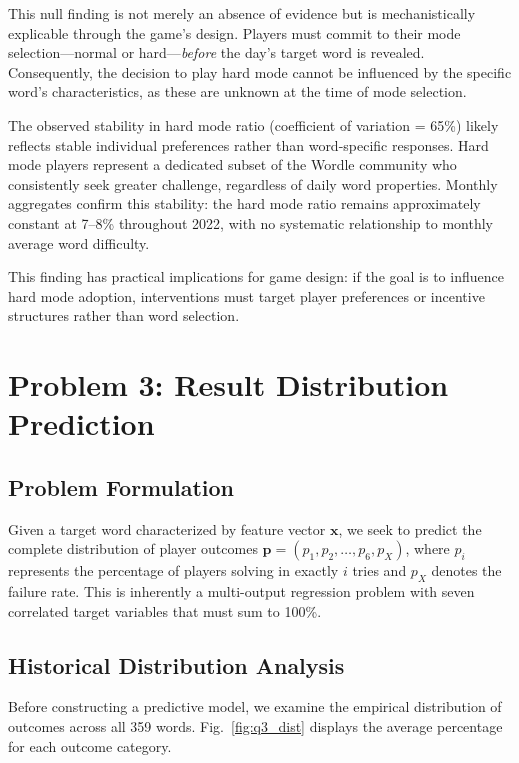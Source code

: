 \documentclass{mcmthesis}
\begin{document}
This null finding is not merely an absence of evidence but is mechanistically explicable through the game's design. Players must commit to their mode selection---normal or hard---\textit{before} the day's target word is revealed. Consequently, the decision to play hard mode cannot be influenced by the specific word's characteristics, as these are unknown at the time of mode selection.

The observed stability in hard mode ratio (coefficient of variation = 65\%) likely reflects stable individual preferences rather than word-specific responses. Hard mode players represent a dedicated subset of the Wordle community who consistently seek greater challenge, regardless of daily word properties. Monthly aggregates confirm this stability: the hard mode ratio remains approximately constant at 7--8\% throughout 2022, with no systematic relationship to monthly average word difficulty.

This finding has practical implications for game design: if the goal is to influence hard mode adoption, interventions must target player preferences or incentive structures rather than word selection.

\section{Problem 3: Result Distribution Prediction}

\subsection{Problem Formulation}

Given a target word characterized by feature vector $\mathbf{x}$, we seek to predict the complete distribution of player outcomes $\mathbf{p} = (p_1, p_2, \ldots, p_6, p_X)$, where $p_i$ represents the percentage of players solving in exactly $i$ tries and $p_X$ denotes the failure rate. This is inherently a multi-output regression problem with seven correlated target variables that must sum to 100\%.

\subsection{Historical Distribution Analysis}

Before constructing a predictive model, we examine the empirical distribution of outcomes across all 359 words. Fig.~\ref{fig:q3_dist} displays the average percentage for each outcome category.
\end{document}
